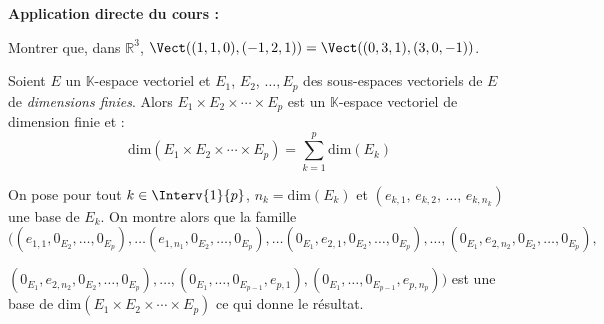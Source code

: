 \documentclass[french,11pt,twoside]{VcCours}
\newenvironment{ApplicationDirecte}{\textbf{Application directe du cours :}

}{}
\begin{document}
\begin{ApplicationDirecte} Montrer que, dans $\mathbb{R}^3$, $\Vect((1,1,0), (-1,2,1))= \Vect((0,3,1), (3,0,-1))$.
\end{ApplicationDirecte}

\begin{Proposition}{}
Soient $E$ un $\mathbb{K}$-espace vectoriel et $E_1$, $E_2$, $\ldots, E_p$ des sous-espaces vectoriels de $E$ de \emph{dimensions finies}. Alors $E_1 \times E_2 \times \cdots \times E_p$ est un $\mathbb{K}$-espace vectoriel de dimension finie et :
$$ \textrm{dim}(E_1 \times E_2 \times \cdots \times E_p) = \sum_{k=1}^p \textrm{dim} (E_k)$$
\end{Proposition}

\begin{Demonstration}{} On pose pour tout $k \in \Interv{1}{p}$, $n_k = \textrm{dim} (E_k)$ et $(e_{k,1}, \, e_{k,2}, \, \ldots, \, e_{k,n_k})$ une base de $E_k$. On montre alors que la famille $((e_{1,1}, 0_{E_2}, \ldots, 0_{E_p}), \ldots (e_{1,n_1}, 0_{E_2}, \ldots, 0_{E_p}), \ldots (0_{E_1},e_{2,1}, 0_{E_2}, \ldots, 0_{E_p}), \ldots,(0_{E_1},e_{2,n_2}, 0_{E_2}, \ldots,0_{E_p}),$

$(0_{E_1},e_{2,n_2}, 0_{E_2}, \ldots,0_{E_p}), \ldots, (0_{E_1},\ldots, 0_{E_{p-1}}, e_{p,1}), (0_{E_1},\ldots, 0_{E_{p-1}}, e_{p,n_p}))$ est une base de $\textrm{dim}(E_1 \times E_2 \times \cdots \times E_p)$ ce qui donne le résultat.
\end{Demonstration}

\medskip

\end{document}
